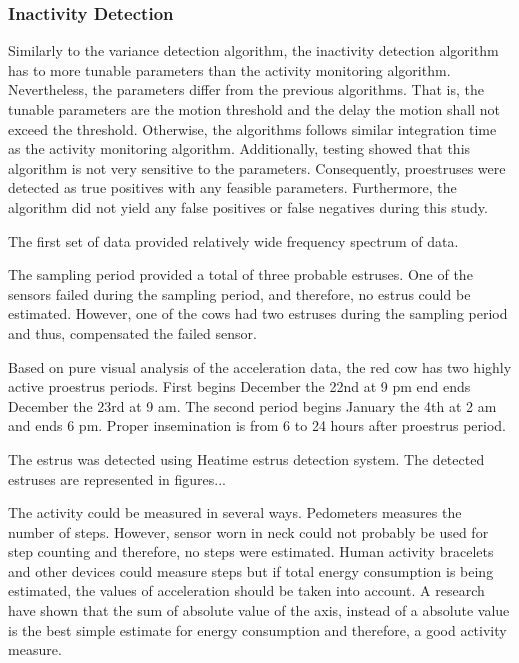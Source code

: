 \documentclass[english,12pt,a4paper,pdftex,elec,utf8]{aaltothesis}
\begin{document}
\subsubsection{Inactivity Detection}\label{inactivitydetectionevaluation}

Similarly to the variance detection algorithm, the inactivity detection algorithm has to more tunable parameters than the activity monitoring algorithm. Nevertheless, the parameters differ from the previous algorithms. That is, the tunable parameters are the motion threshold and the delay the motion shall not exceed the threshold. Otherwise, the algorithms follows similar integration time as the activity monitoring algorithm. Additionally, testing showed that this algorithm is not very sensitive to the parameters. Consequently, proestruses were detected as true positives with any feasible parameters. Furthermore, the algorithm did not yield any false positives or false negatives during this study.




The first set of data provided relatively wide frequency spectrum of data.


The sampling period provided a total of three probable estruses. One of the sensors failed during the sampling period, and therefore, no estrus could be estimated. However, one of the cows had two estruses during the sampling period and thus, compensated the failed sensor.

Based on pure visual analysis of the acceleration data, the red cow has two highly active proestrus periods. First begins December the 22nd at 9 pm end ends December the 23rd at 9 am. The second period begins January the 4th at 2 am and ends 6 pm. Proper insemination is from 6 to 24 hours after proestrus period.

The estrus was detected using Heatime estrus detection system. The detected estruses are represented in figures...



The activity could be measured in several ways. Pedometers measures the number of steps. However, sensor worn in neck could not probably be used for step counting and therefore, no steps were estimated. Human activity bracelets and other devices could measure steps but if total energy consumption is being estimated, the values of acceleration should be taken into account. A research have shown that the sum of absolute value of the axis, instead of a absolute value is the best simple estimate for energy consumption and therefore, a good activity measure.
\end{document}

